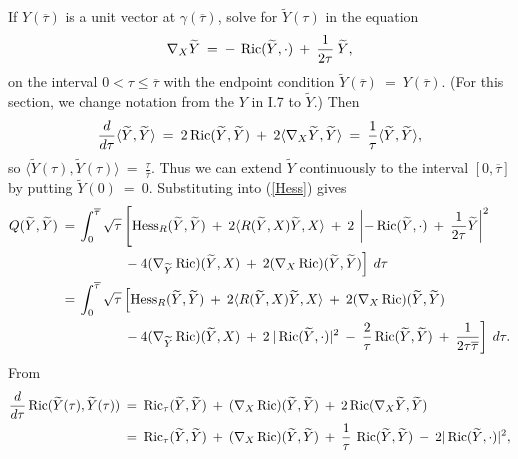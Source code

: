 If $Y(\overline{\tau})$
is a unit vector at $\gamma(\overline{\tau})$, solve for
$\widetilde{Y}(\tau)$ in the equation
\begin{equation} \label{diffeq}
\nabla_X \widetilde{Y} \: = \: - \: \operatorname{Ric}(\widetilde{Y}, \cdot)
\: + \: \frac{1}{2\tau} \:\widetilde{Y},
\end{equation}
on the interval $0<\tau\leq \overline{\tau}$ with the endpoint condition
$\widetilde{Y}(\overline{\tau}) \: = \:
Y(\overline{\tau})$.
(For this section, we change notation from the
$Y$ in I.7 to $\widetilde{Y}$.)
Then
\begin{equation}
\frac{d}{d\tau} \langle \widetilde{Y}, \widetilde{Y} \rangle \: = \:
2 \operatorname{Ric}(\widetilde{Y}, \widetilde{Y})
\: + \: 2 \langle \nabla_X \widetilde{Y}, \widetilde{Y} \rangle \: = \:
\frac{1}{\tau} \langle \widetilde{Y}, \widetilde{Y} \rangle,
\end{equation}
so
$\langle \widetilde{Y}(\tau), \widetilde{Y}(\tau) \rangle \: = \:
\frac{\tau}{\overline{\tau}}$.
Thus we can extend $\widetilde{Y}$ continuously to the interval $[0,\overline{\tau}]$
by putting $\widetilde{Y}(0) \: = \: 0$.
Substituting into
(\ref{Hess}) gives
\begin{align} \label{sub1}
Q(\widetilde{Y}, \widetilde{Y}) \: = \: & \int_0^{\overline{\tau}}
\sqrt{\tau} \left[\operatorname{Hess}_R (\widetilde{Y},\widetilde{Y}) \: + \:
2 \langle R(\widetilde{Y}, X) \widetilde{Y}, X \rangle
\: + \: 2 \: \left| - \operatorname{Ric}(\widetilde{Y}, \cdot) \: + \:
\frac{1}{2\tau} \widetilde{Y} \right|^2 \right. \\
&
\: \: \: \: \: \: \: \: \: \: \: \: \: \: \:
 \left. - \: 4 (\nabla_{\widetilde{Y}} \operatorname{Ric}) (\widetilde{Y}, X) \: + \: 2
(\nabla_X \operatorname{Ric}) (\widetilde{Y}, \widetilde{Y}) \right] \: d\tau \notag \\
= \: & \int_0^{\overline{\tau}}
\sqrt{\tau} \left[\operatorname{Hess}_R (\widetilde{Y},\widetilde{Y}) \: + \:
2 \langle R(\widetilde{Y}, X) \widetilde{Y}, X \rangle  \: + \: 2
(\nabla_X \operatorname{Ric}) (\widetilde{Y}, \widetilde{Y}) \: \right. \notag \\
&
\: \: \: \: \: \: \: \: \: \: \: \: \: \: \:
\left. - \: 4 (\nabla_{\widetilde{Y}} \operatorname{Ric}) (\widetilde{Y}, X) \:
+ \: 2 \: |\operatorname{Ric}(\widetilde{Y}, \cdot)|^2 \: - \: \frac{2}{\tau}
\operatorname{Ric}(\widetilde{Y}, \widetilde{Y})
\: + \:
\frac{1}{2\tau \overline{\tau}}
\right] \: d\tau. \notag
\end{align}
From
\begin{align}
\frac{d}{d\tau} \operatorname{Ric}(\widetilde{Y}(\tau), \widetilde{Y}(\tau)) \: & = \:
\operatorname{Ric}_\tau(\widetilde{Y}, \widetilde{Y}) \: + \:
(\nabla_X \operatorname{Ric})(\widetilde{Y}, \widetilde{Y}) \: + \: 2
\operatorname{Ric}(\nabla_X \widetilde{Y}, \widetilde{Y}) \\
& = \: \operatorname{Ric}_\tau(\widetilde{Y}, \widetilde{Y}) \: + \:
(\nabla_X \operatorname{Ric})(\widetilde{Y}, \widetilde{Y}) \: + \:
\frac{1}{\tau} \: \operatorname{Ric}(\widetilde{Y}, \widetilde{Y}) \: - \:
2 |\operatorname{Ric}(\widetilde{Y}, \cdot)|^2, \notag
\end{align}
